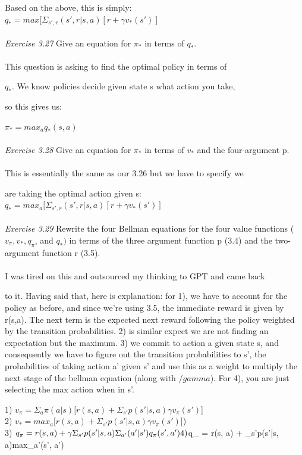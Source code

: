 \documentclass{article}
\begin{document}
Based on the above, this is simply: \\

$q_{*} = max[\Sigma_{s', r}(s', r|s, a)[r + \gamma v_{*}(s')]$
\\
\\
\textit{Exercise 3.27} Give an equation for $\pi_{*}$ in terms of $q_{*}$. \\
\\

This question is asking to find the optimal policy in terms of 

$q_{*}$. We know policies decide given state s what action you take, 

so this gives us: 

$\pi_{*} = max_{a}q_{*}(s,a) $
\\
\\
\textit{Exercise 3.28} Give an equation for $\pi_{*}$ in terms of $v_{*}$ and the four-argument p.  \\
\\

This is essentially the same as our 3.26 but we have to specify we 

are taking the optimal action given s:  \\

$q_{*} = max_{a}[\Sigma_{s', r}(s', r|s, a)[r + \gamma v_{*}(s')]$
\\
\\
\textit{Exercise 3.29} Rewrite the four Bellman equations for the four value functions ($v_{\pi}, v_{*}, q_{\pi}$, and $q_{*})$ in terms of the three argument function p (3.4) and the two-argument function r (3.5).   \\
\\

I was tired on this and outsourced my thinking to GPT and came back 

to it. Having said that, here is explanation: for 1), we have to account for the policy as before, and since we're using 3.5, the immediate reward is given by r(s,a). The next term is the expected next reward following the policy weighted by the transition probabilities. 2) is similar expect we are not finding an expectation but the maximum. 3) we commit to action a given state s, and consequently we have to figure out the transition probabilities to s', the probabilities of taking action a' given s' and use this as a weight to multiply the next stage of the bellman equation (along with $/gamma$). For 4), you are just selecting the max action when in s'. 



1) $v_{\pi} = \Sigma_{a}\pi(a|s)[r(s, a) + \Sigma_{s'}p(s'|s, a)\gamma v_{\pi}(s')$]\\

2)  $v_{*} = max_{a}[r(s, a) + \Sigma_{s'}p(s'|s, a)\gamma v_{\pi}(s')$])\\

3) $q_{\pi} = r(s, a) + \gamma \Sigma_{s'}p(s'|s, a)\Sigma_{a'}(a'| s')q_{\pi}(s', a')
\\

4) $q_{\*} = r(s, a) + \gamma \Sigma_{s'}p(s'|s, a)max_{a'}(s', a')
\end{document}
